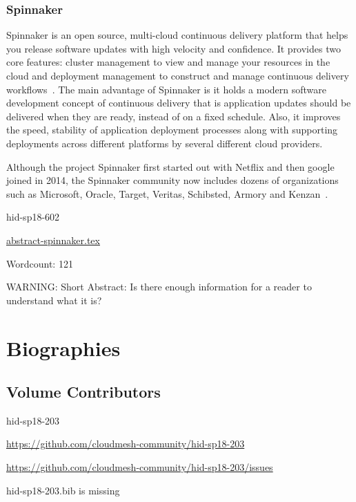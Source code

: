 \section{Spinnaker}

Spinnaker is an open source, multi-cloud continuous delivery platform
that helps you release software updates with high velocity and
confidence.  It provides two core features: cluster management to view
and manage your resources in the cloud and deployment management to
construct and manage continuous delivery
workflows~\cite{hid-sp18-602-www-spinnaker-io}. The main advantage of
Spinnaker is it holds a modern software development concept of
continuous delivery that is application updates should be delivered
when they are ready, instead of on a fixed schedule.  Also, it
improves the speed, stability of application deployment processes
along with supporting deployments across different platforms by
several different cloud providers.

Although the project Spinnaker first started out with Netflix and then
google joined in 2014, the Spinnaker community now includes dozens of
organizations such as Microsoft, Oracle, Target, Veritas,
Schibsted, Armory and Kenzan~\cite{hid-sp18-602-www-spinnaker-gc}.



\begin{IU}

hid-sp18-602

\href{https://github.com/cloudmesh-community/hid-sp18-602/blob/master//technology/abstract-spinnaker.tex}{abstract-spinnaker.tex}

 

Wordcount: 121

WARNING: Short Abstract: Is there enough information for a reader to understand what it is?

\end{IU}

\part{Biographies}
\chapter{Volume Contributors}


\begin{IU}

hid-sp18-203

\url{https://github.com/cloudmesh-community/hid-sp18-203}

\url{https://github.com/cloudmesh-community/hid-sp18-203/issues}

hid-sp18-203.bib is missing

\end{IU}


